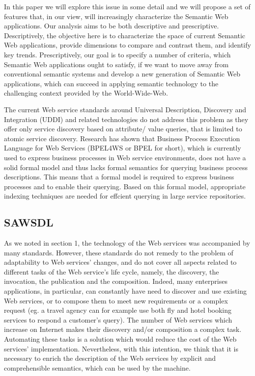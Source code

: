 \documentclass[10pt,a4paper]{article}
\begin{document}
In this paper we will explore this issue in some detail and we will propose a set of
features that, in our view, will increasingly characterize the Semantic Web
applications. Our analysis aims to be both descriptive and prescriptive. Descriptively,
the objective here is to characterize the space of current Semantic Web applications,
provide dimensions to compare and contrast them, and identify key trends.
Prescriptively, our goal is to specify a number of criteria, which Semantic Web
applications ought to satisfy, if we want to move away from conventional semantic
systems and develop a new generation of Semantic Web applications, which can
succeed in applying semantic technology to the challenging context provided by the
World-Wide-Web. \cite{ngswa}

The current Web service standards around Universal
Description, Discovery and Integration (UDDI) and related technologies do not address this
problem as they offer only service discovery based on attribute/ value queries, that is limited
to atomic service discovery. Research has shown that Business Process Execution Language
for Web Services (BPEL4WS or BPEL for short), which is currently used to express business
processes in Web service environments, does not have a solid formal model and thus lacks
formal semantics for querying business process descriptions. This means that a formal model is
required to express business processes and to enable their querying. Based on this formal model,
appropriate indexing techniques are needed for effcient querying in large service repositories. \cite{mothesis}

\subsection{SAWSDL}

As we noted in section 1, the technology of the Web
services was accompanied by many standards. However,
these standards do not remedy to the problem of adaptability
to Web services’ changes, and do not cover all aspects related
to different tasks of the Web service’s life cycle, namely, the
discovery, the invocation, the publication and the
composition. Indeed, many enterprises applications, in
particular, can constantly have need to discover and use
existing Web services, or to compose them to meet new
requirements or a complex request (eg. a travel agency can
for example use both fly and hotel booking services to
respond a customer’s query). The number of Web services
which increase on Internet makes their discovery and/or
composition a complex task. Automating these tasks is a
solution which would reduce the cost of the Web services’
implementation. Nevertheless, with this intention, we think
that it is necessary to enrich the description of the Web
services by explicit and comprehensible semantics, which can
be used by the machine. \cite{ei-sawsdl}
\end{document}
